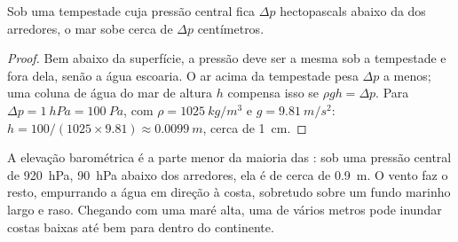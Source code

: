 \begin{proposition}\label{prop:g10:storms-and-cyclones:bulge}
Sob uma tempestade cuja pressão central fica $\Delta p$ hectopascals abaixo
da dos arredores, o mar sobe cerca de $\Delta p$ centímetros.
\end{proposition}

\begin{proof}
Bem abaixo da superfície, a pressão deve ser a mesma sob a tempestade e
fora dela, senão a água escoaria. O ar acima da tempestade pesa $\Delta p$ a
menos; uma coluna de água do mar de altura $h$ compensa isso se
$\rho g h = \Delta p$. Para $\Delta p = \qty{1}{hPa} = \qty{100}{Pa}$, com
$\rho = \qty{1025}{kg/m^3}$ e $g = \qty{9.81}{m/s^2}$: $h = 100/(1025
\times 9.81) \approx \qty{0.0099}{m}$, cerca de \qty{1}{cm}.
\end{proof}

A elevação barométrica é a parte menor da maioria das :
sob uma pressão central de \qty{920}{hPa}, \qty{90}{hPa} abaixo dos
arredores, ela é de cerca de \qty{0.9}{m}. O vento faz o resto, empurrando
a água em direção à costa, sobretudo sobre um fundo marinho largo e raso.
Chegando com uma maré alta, uma  de vários metros pode
inundar costas baixas até bem para dentro do continente.


